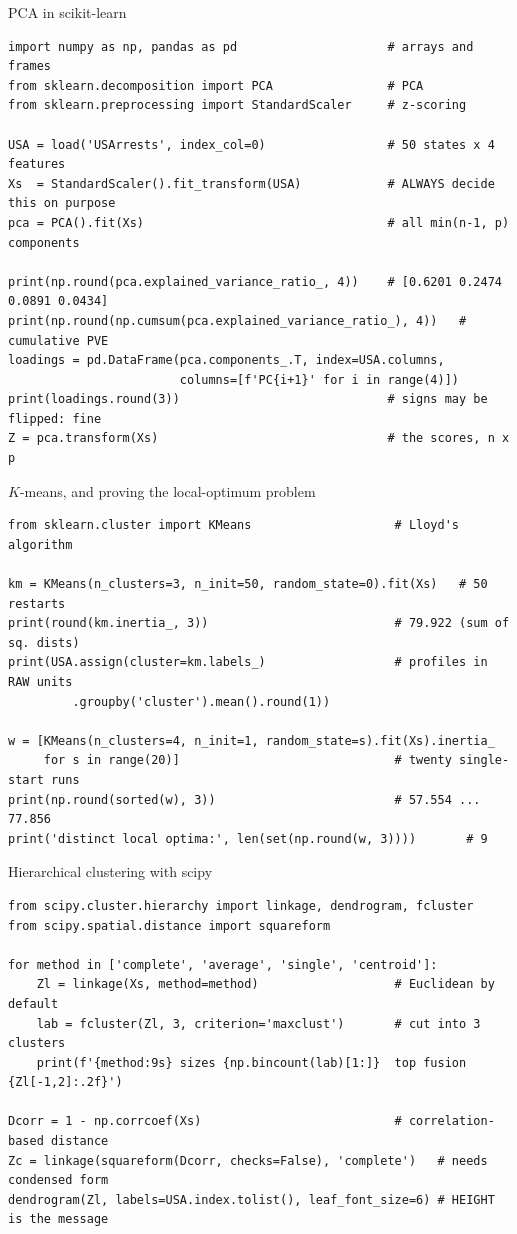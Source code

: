 \documentclass[aspectratio=169,11pt]{beamer}
\begin{document}
\begin{frame}[fragile]{PCA in scikit-learn}
  \begin{lstlisting}
import numpy as np, pandas as pd                     # arrays and frames
from sklearn.decomposition import PCA                # PCA
from sklearn.preprocessing import StandardScaler     # z-scoring

USA = load('USArrests', index_col=0)                 # 50 states x 4 features
Xs  = StandardScaler().fit_transform(USA)            # ALWAYS decide this on purpose
pca = PCA().fit(Xs)                                  # all min(n-1, p) components

print(np.round(pca.explained_variance_ratio_, 4))    # [0.6201 0.2474 0.0891 0.0434]
print(np.round(np.cumsum(pca.explained_variance_ratio_), 4))   # cumulative PVE
loadings = pd.DataFrame(pca.components_.T, index=USA.columns,
                        columns=[f'PC{i+1}' for i in range(4)])
print(loadings.round(3))                             # signs may be flipped: fine
Z = pca.transform(Xs)                                # the scores, n x p
  \end{lstlisting}
\end{frame}

\begin{frame}[fragile]{$K$-means, and proving the local-optimum problem}
  \begin{lstlisting}
from sklearn.cluster import KMeans                    # Lloyd's algorithm

km = KMeans(n_clusters=3, n_init=50, random_state=0).fit(Xs)   # 50 restarts
print(round(km.inertia_, 3))                          # 79.922 (sum of sq. dists)
print(USA.assign(cluster=km.labels_)                  # profiles in RAW units
         .groupby('cluster').mean().round(1))

w = [KMeans(n_clusters=4, n_init=1, random_state=s).fit(Xs).inertia_
     for s in range(20)]                              # twenty single-start runs
print(np.round(sorted(w), 3))                         # 57.554 ... 77.856
print('distinct local optima:', len(set(np.round(w, 3))))       # 9
  \end{lstlisting}
\end{frame}

\begin{frame}[fragile]{Hierarchical clustering with scipy}
  \begin{lstlisting}
from scipy.cluster.hierarchy import linkage, dendrogram, fcluster
from scipy.spatial.distance import squareform

for method in ['complete', 'average', 'single', 'centroid']:
    Zl = linkage(Xs, method=method)                   # Euclidean by default
    lab = fcluster(Zl, 3, criterion='maxclust')       # cut into 3 clusters
    print(f'{method:9s} sizes {np.bincount(lab)[1:]}  top fusion {Zl[-1,2]:.2f}')

Dcorr = 1 - np.corrcoef(Xs)                           # correlation-based distance
Zc = linkage(squareform(Dcorr, checks=False), 'complete')   # needs condensed form
dendrogram(Zl, labels=USA.index.tolist(), leaf_font_size=6) # HEIGHT is the message
  \end{lstlisting}
\end{frame}
\end{document}
